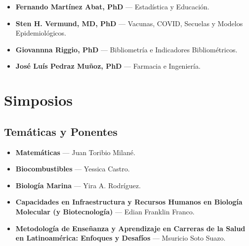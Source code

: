 \documentclass[11pt,a4paper]{article}
\begin{document}
\begin{itemize}[leftmargin=*, label={--}]
    \item \textbf{Fernando Martínez Abat, PhD} --- Estadística y Educación.
    \item \textbf{Sten H. Vermund, MD, PhD} --- Vacunas, COVID, Secuelas y Modelos Epidemiológicos.
    \item \textbf{Giovannna Riggio, PhD} --- Bibliometría e Indicadores Bibliométricos.
    \item \textbf{José Luís Pedraz Muñoz, PhD} --- Farmacia e Ingeniería.
\end{itemize}


\section{Simposios}

\subsection{Temáticas y Ponentes}
\begin{itemize}[leftmargin=*, label={--}]
    \item \textbf{Matemáticas} --- Juan Toribio Milané.
    \item \textbf{Biocombustibles} --- Yessica Castro.
    \item \textbf{Biología Marina} --- Yira A. Rodríguez.
    \item \textbf{Capacidades en Infraestructura y Recursos Humanos en Biología Molecular (y Biotecnología)} --- Edian Franklin Franco.
    \item \textbf{Metodología de Enseñanza y Aprendizaje en Carreras de la Salud en Latinoamérica: Enfoques y Desafíos} --- Msuricio Soto Suazo.
\end{itemize}
\end{document}
